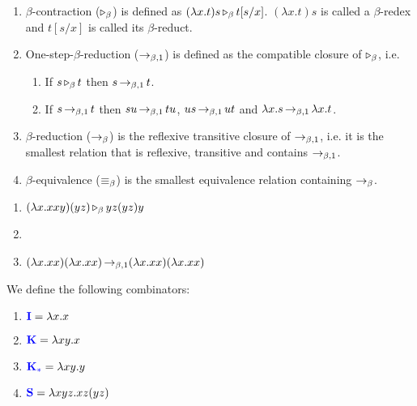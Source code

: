 \begin{boxdefi}
    \hfill
    \begin{enumerate}
        \item \alert{$\beta$-contraction ($\operatorname{\triangleright_{\beta}}$)} is defined as $(\lambda x. t) s \operatorname{\triangleright_{\beta}} t [s/x]$. $(\lambda x. t) s$ is called a \alert{$\beta$-redex} and $t [s/x]$ is called its \alert{$\beta$-reduct}.
        \item {\alert{One-step-$\beta$-reduction ($\operatorname{\to_{\beta, 1}}$)} is defined as the compatible closure of $\operatorname{\triangleright_{\beta}}$, i.e.
            \begin{enumerate}
                \item If $s \operatorname{\triangleright_{\beta}} t$ then $s \operatorname{\to_{\beta, 1}} t$.
                \item If $s \operatorname{\to_{\beta, 1}} t$ then $su \operatorname{\to_{\beta, 1}} tu$, $us \operatorname{\to_{\beta, 1}} ut$ and $\lambda x. s \operatorname{\to_{\beta, 1}} \lambda x. t$.
            \end{enumerate}}
        \item \alert{$\beta$-reduction ($\operatorname{\to_{\beta}}$)} is the reflexive transitive closure of $\operatorname{\to_{\beta, 1}}$, i.e. it is the smallest relation that is reflexive, transitive and contains $\operatorname{\to_{\beta, 1}}$.
        \item \alert{$\beta$-equivalence ($\operatorname{\equiv_{\beta}}$)} is the smallest equivalence relation containing $\operatorname{\to_{\beta}}$.
    \end{enumerate}
\end{boxdefi}

\begin{example}\label{ex:betared}
    \hfill
    \begin{enumerate}
        \item $(\lambda x. xxy)(yz) \operatorname{\triangleright_{\beta}} yz(yz)y$
        \item {}
            \vspace{-2em}
        \item $(\lambda x.xx) (\lambda x. xx) \operatorname{\to_{\beta, 1}} (\lambda x.xx) (\lambda x. xx)$
    \end{enumerate}
\end{example}

\begin{boxdefi}\label{defi:IKS}
    We define the following combinators: 
    \begin{enumerate}
        \item $\alert{I} = \lambda x.x$
        \item $\alert{K} = \lambda xy.x$
        \item $\alert{K_*} = \lambda xy.y$
        \item $\alert{S} = \lambda xyz.xz(yz)$
    \end{enumerate}
\end{boxdefi}

